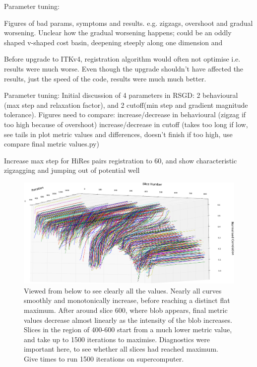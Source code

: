       Parameter tuning:
      
      Figures of bad params, symptoms and results. e.g. zigzags, overshoot and gradual worsening. Unclear how the gradual worsening happens; could be an oddly shaped v-shaped cost basin, deepening steeply along one dimension and 
      
      Before upgrade to ITKv4, registration algorithm would often not optimise i.e. results were much worse. Even though the upgrade shouldn't have affected the results, just the speed of the code, results were much much better.
      
      Parameter tuning:
      Initial discussion of 4 parameters in RSGD: 2 behavioural (max step and relaxation factor), and 2 cutoff(min step and gradient magnitude tolerance).
      Figures need to compare:
        increase/decrease in behavioural (zigzag if too high because of overshoot)
      increase/decrease in cutoff (takes too long if low, see tails in plot metric values and differences, doesn't finish if too high, use compare final metric values.py)

      Increase max step for HiRes pairs registration to 60, and show characteristic zigzagging and jumping out of potential well
      
      \begin{figure}
        \centering
        \includegraphics[width=\textheight]{Ch6/Figs/diagnostics/rigid_metric_values}
        \caption{Viewed from below to see clearly all the values. Nearly all curves smoothly and monotonically increase, before reaching a distinct flat maximum. After around slice 600, where blob appears, final metric values decrease almost linearly as the intensity of the blob increases. Slices in the region of 400-600 start from a much lower metric value, and take up to 1500 iterations to maximise. Diagnostics were important here, to see whether all slices had reached maximum. Give times to run 1500 iterations on supercomputer.}
        \label{fig:rigid_metric_values}
      \end{figure}
      
